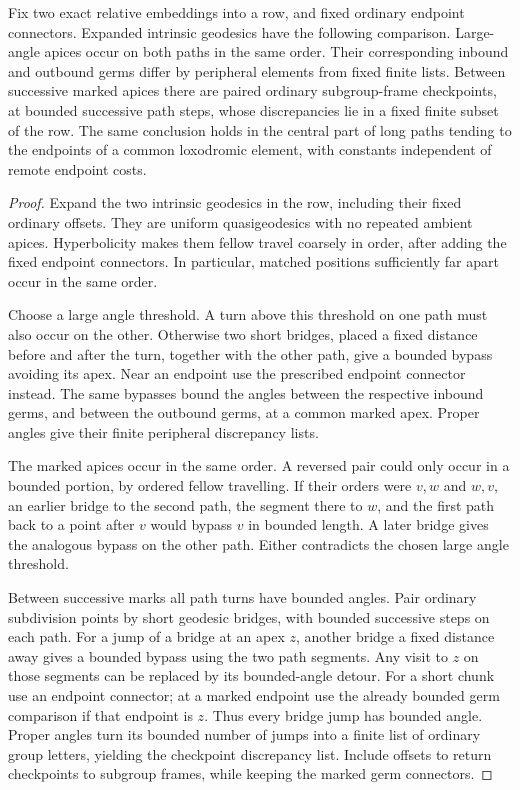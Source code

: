 \begin{lemma}\label{transfer:unfilled-comparison}
Fix two exact relative embeddings into a row, and fixed ordinary
endpoint connectors. Expanded intrinsic geodesics have the following
comparison. Large-angle apices occur on both paths in the same order.
Their corresponding inbound and outbound germs differ by peripheral
elements from fixed finite lists. Between successive marked apices
there are paired ordinary subgroup-frame checkpoints, at bounded
successive path steps, whose discrepancies lie in a fixed finite
subset of the row. The same conclusion holds in the central part of
long paths tending to the endpoints of a common loxodromic element,
with constants independent of remote endpoint costs.
\end{lemma}
\begin{proof}
Expand the two intrinsic geodesics in the row, including their fixed
ordinary offsets. They are uniform quasigeodesics with no repeated
ambient apices. Hyperbolicity makes them fellow travel coarsely in
order, after adding the fixed endpoint connectors. In particular,
matched positions sufficiently far apart occur in the same order.

Choose a large angle threshold. A turn above this threshold on one
path must also occur on the other. Otherwise two short bridges,
placed a fixed distance before and after the turn, together with
the other path, give a bounded bypass avoiding its apex. Near an
endpoint use the prescribed endpoint connector instead. The same
bypasses bound the angles between the respective inbound germs,
and between the outbound germs, at a common marked apex. Proper
angles give their finite peripheral discrepancy lists.

The marked apices occur in the same order. A reversed pair could
only occur in a bounded portion, by ordered fellow travelling.
If their orders were $v,w$ and $w,v$, an earlier bridge to the
second path, the segment there to $w$, and the first path back to
a point after $v$ would bypass $v$ in bounded length. A later
bridge gives the analogous bypass on the other path. Either
contradicts the chosen large angle threshold.

Between successive marks all path turns have bounded angles.
Pair ordinary subdivision points by short geodesic bridges, with
bounded successive steps on each path. For a jump of a bridge at
an apex $z$, another bridge a fixed distance away gives a bounded
bypass using the two path segments. Any visit to $z$ on those
segments can be replaced by its bounded-angle detour. For a short
chunk use an endpoint connector; at a marked endpoint use the
already bounded germ comparison if that endpoint is $z$.
Thus every bridge jump has bounded angle. Proper angles turn its
bounded number of jumps into a finite list of ordinary group
letters, yielding the checkpoint discrepancy list. Include offsets
to return checkpoints to subgroup frames, while keeping the marked
germ connectors.


\end{proof}
